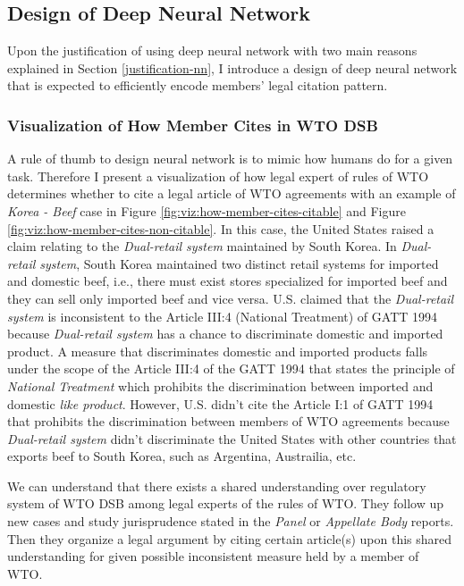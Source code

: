 \documentclass[12pt,letterpaper]{article}
\begin{document}
\subsection{Design of Deep Neural Network}
Upon the justification of using deep neural network with two main reasons explained in Section \ref{justification-nn}, %
I introduce a design of deep neural network that is expected to efficiently encode members' legal citation pattern.

\subsubsection{Visualization of How Member Cites in WTO DSB}
A rule of thumb to design neural network is to mimic 
how humans do for a given task. 
Therefore I present a visualization of how legal expert of rules of WTO determines whether to cite a legal article of WTO agreements with an example of \textit{Korea - Beef} case in Figure \ref{fig:viz:how-member-cites-citable} and Figure \ref{fig:viz:how-member-cites-non-citable}.
In this case, the United States raised a claim relating to the \textit{Dual-retail system} maintained by South Korea. In \textit{Dual-retail system}, South Korea maintained two distinct retail systems
for imported and domestic beef, i.e., there must exist stores specialized for imported beef and they can sell only imported beef and vice versa. U.S. claimed that the \textit{Dual-retail system} is inconsistent to the Article III:4 (National Treatment) of GATT 1994 
because \textit{Dual-retail system} has a chance to discriminate domestic and imported product. A measure that discriminates domestic and imported products falls under the scope of the Article III:4 of the GATT 1994 that states the principle of \textit{National Treatment} which prohibits the discrimination between imported and domestic \textit{like product}. However, U.S. didn't 
cite the Article I:1 of GATT 1994 that prohibits the discrimination between members of WTO agreements
because \textit{Dual-retail system} didn't discriminate the United States with other countries that exports beef to South Korea, such as Argentina, Austrailia, etc.

We can understand that there exists a shared understanding over regulatory system of WTO DSB among legal experts of the rules of WTO. They follow up new cases and study jurisprudence stated in the \textit{Panel} or  \textit{Appellate Body} reports.
Then they organize a legal argument by citing certain article(s) upon this shared understanding for given possible inconsistent measure held by a member of WTO.
\end{document}
